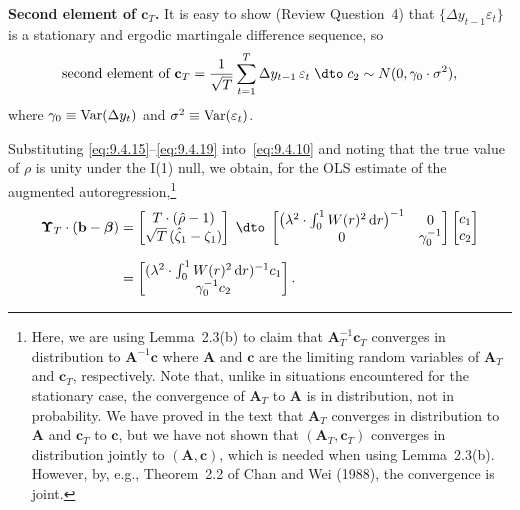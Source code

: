 \textbf{Second element of $\mathbf{c}_T$.} It is easy to show (Review Question~4) that $\{\Delta y_{t-1}\varepsilon_t\}$ is a
stationary and ergodic martingale difference sequence, so
\begin{equation}
\label{eq:9.4.19}
\text{second element of } \mathbf{c}_T
= \frac{1}{\sqrt{T}}\sum_{t=1}^{T}\Delta y_{t-1}\,\varepsilon_t
\;\dto\; c_2 \sim N(0, \gamma_0 \cdot \sigma^2),
\end{equation}
where $\gamma_0 \equiv \operatorname{Var}(\Delta y_t)$ and $\sigma^2 \equiv \operatorname{Var}(\varepsilon_t)$.

Substituting \eqref{eq:9.4.15}--\eqref{eq:9.4.19} into~\eqref{eq:9.4.10} and noting that the true value of
$\rho$ is unity under the I(1) null, we obtain, for the OLS estimate of the augmented
autoregression,\footnote{Here, we are using Lemma~2.3(b) to claim that $\mathbf{A}_T^{-1}\mathbf{c}_T$ converges in distribution to $\mathbf{A}^{-1}\mathbf{c}$ where $\mathbf{A}$ and $\mathbf{c}$
are the limiting random variables of $\mathbf{A}_T$ and $\mathbf{c}_T$, respectively. Note that, unlike in situations encountered for the
stationary case, the convergence of $\mathbf{A}_T$ to $\mathbf{A}$ is in distribution, not in probability. We have proved in the text that
$\mathbf{A}_T$ converges in distribution to $\mathbf{A}$ and $\mathbf{c}_T$ to $\mathbf{c}$, but we have not shown that $(\mathbf{A}_T, \mathbf{c}_T)$ converges in distribution
jointly to $(\mathbf{A}, \mathbf{c})$, which is needed when using Lemma~2.3(b). However, by, e.g., Theorem~2.2 of Chan and Wei
(1988), the convergence is joint.}
\begin{align}
\bm{\Upsilon}_T \cdot (\mathbf{b} - \bm{\beta})
&= \begin{bmatrix} T \cdot (\hat{\rho} - 1) \\ \sqrt{T}\,(\hat{\zeta}_1 - \zeta_1) \end{bmatrix}
\;\dto\;
\begin{bmatrix}
\big(\lambda^2 \cdot \int_0^1 W(r)^2\,\mathrm{d}r\big)^{-1} & 0 \\
0 & \gamma_0^{-1}
\end{bmatrix}
\begin{bmatrix} c_1 \\ c_2 \end{bmatrix} \notag \\[6pt]
&= \begin{bmatrix}
(\lambda^2 \cdot \int_0^1 W(r)^2\,\mathrm{d}r)^{-1} c_1 \\
\gamma_0^{-1} c_2
\end{bmatrix}.
\label{eq:9.4.20result}
\end{align}
